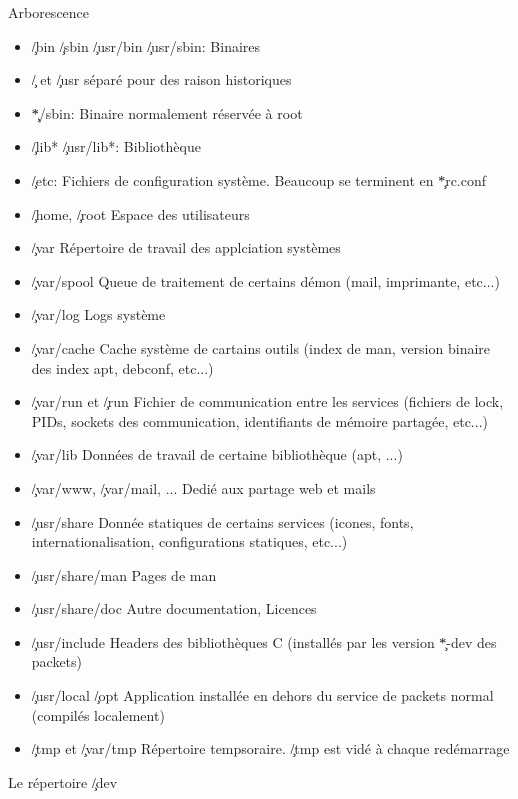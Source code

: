 \begin{frame}[fragile=singleslide]{Arborescence}
  \begin{itemize}
  \item \c{/bin} \c{/sbin} \c{/usr/bin} \c{/usr/sbin}: Binaires
  \item \c{/} et \c{/usr} séparé pour des raison historiques
  \item \c{*/sbin}: Binaire normalement réservée à root
  \item \c{/lib*} \c{/usr/lib*}: Bibliothèque
  \item  \c{/etc}:  Fichiers  de  configuration système.  Beaucoup  se
    terminent en \c{*rc.conf}
  \item \c{/home}, \c{/root} Espace des utilisateurs
  \item \c{/var} Répertoire de travail des applciation systèmes
  \item \c{/var/spool}  Queue de  traitement de certains  démon (mail,
    imprimante, etc...)
  \item \c{/var/log} Logs système
  \item \c{/var/cache} Cache système de cartains outils (index de man,
    version binaire des index apt, debconf, etc...)
  \item \c{/var/run}  et \c{/run}  Fichier de communication  entre les
    services  (fichiers  de  lock,  PIDs, sockets  des  communication,
    identifiants de mémoire partagée, etc...)
  \item \c{/var/lib} Données de travail de certaine bibliothèque (apt,
    ...)
  \item  \c{/var/www}, \c{/var/mail},  ...  Dedié aux  partage web  et
    mails
  \item \c{/usr/share} Donnée  statiques de certains services (icones,
    fonts, internationalisation, configurations statiques, etc...)
  \item \c{/usr/share/man} Pages de man
  \item \c{/usr/share/doc} Autre documentation, Licences
  \item  \c{/usr/include} Headers des  bibliothèques C  (installés par
    les version \c{*-dev} des packets)
  \item  \c{/usr/local} \c{/opt}  Application installée  en  dehors du
    service de packets normal (compilés localement)
  \item \c{/tmp} et  \c{/var/tmp} Répertoire tempsoraire. \c{/tmp} est
    vidé à chaque redémarrage
  \end{itemize}
  Le répertoire \c{/dev}

\end{frame}

